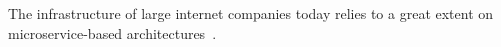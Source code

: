 The infrastructure of large internet companies today relies to a great extent on microservice-based architectures~\cite{}.


\Blindtext[15]
